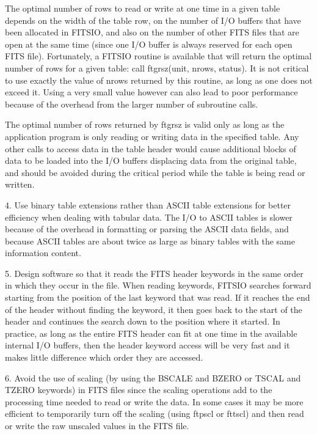 \documentclass[11pt]{book}
\begin{document}
The optimal number of rows to read or write at one time in a given
table depends on the width of the table row, on the number of I/O
buffers that have been allocated in FITSIO, and also on the number of
other FITS files that are open at the same time (since one I/O buffer
is always reserved for each open FITS file).  Fortunately, a FITSIO
routine is available that will return the optimal number of rows for a
given table:  call ftgrsz(unit, nrows, status).  It is not critical to
use exactly the value of nrows returned by this routine, as long as one
does not exceed it.  Using a very small value however can also lead to
poor performance because of the overhead from the larger number of
subroutine calls.

The optimal number of rows returned by ftgrsz is valid only as long as
the application program is only reading or writing data in the
specified table.  Any other calls to access data in the table header
would  cause additional blocks of data to be
loaded into the I/O buffers displacing data from the original table,
and should be avoided during the critical period while the table is
being read or written.

4.  Use binary table extensions rather than ASCII table
extensions for better efficiency  when dealing with tabular data.  The
I/O to ASCII tables is slower because of the overhead in formatting or
parsing the ASCII data fields, and because ASCII tables are about twice
as large as binary tables with the same information content.

5. Design software so that it reads the FITS header keywords in the
same order in which they occur in the file.  When reading keywords,
FITSIO searches forward starting from the position of the last keyword
that was read.  If it reaches the end of the header without finding the
keyword, it then goes back to the start of the header and continues the
search down to the position where it started.  In practice, as long as
the entire FITS header can fit at one time in the available internal I/O
buffers, then the header keyword access will be very fast and it makes
little difference which order they are accessed.

6. Avoid the use of scaling (by using the BSCALE and BZERO or TSCAL and
TZERO keywords) in FITS files since the scaling operations add to the
processing time needed to read or write the data.  In some cases it may
be more efficient to temporarily turn off the scaling (using ftpscl or
fttscl) and then read or write the raw unscaled values in the FITS
file.
\end{document}

